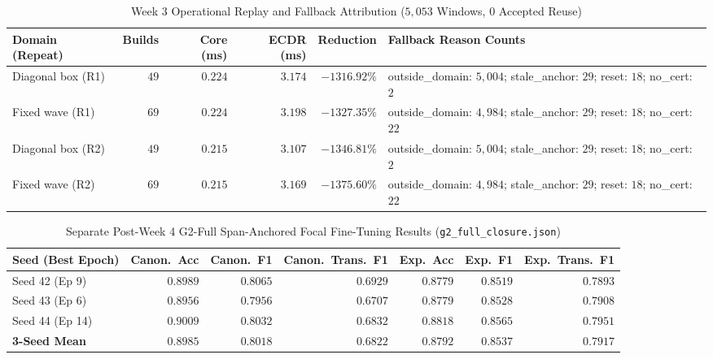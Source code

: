 \documentclass[11pt,oneside,a4paper]{report}
\newcommand{\code}[1]{{\small\upshape\ttfamily #1}}
\theoremstyle{remark}
\begin{document}
\begin{table}[htbp]
\centering\small
\caption{Week 3 Operational Replay and Fallback Attribution ($5,053$ Windows, $0$ Accepted Reuse)}
\label{tab:app_w3_replay}
\begin{tabularx}{\textwidth}{@{}lrrrrY@{}}
\toprule
\textbf{Domain (Repeat)} & \textbf{Builds} & \textbf{Core (ms)} & \textbf{ECDR (ms)} & \textbf{Reduction} & \textbf{Fallback Reason Counts} \\
\midrule
Diagonal box (R1) & $49$ & $0.224$ & $3.174$ & $-1316.92\%$ & \code{outside\_domain}: $5,004$; \code{stale\_anchor}: $29$; \code{reset}: $18$; \code{no\_cert}: $2$ \\
Fixed wave (R1) & $69$ & $0.224$ & $3.198$ & $-1327.35\%$ & \code{outside\_domain}: $4,984$; \code{stale\_anchor}: $29$; \code{reset}: $18$; \code{no\_cert}: $22$ \\
Diagonal box (R2) & $49$ & $0.215$ & $3.107$ & $-1346.81\%$ & \code{outside\_domain}: $5,004$; \code{stale\_anchor}: $29$; \code{reset}: $18$; \code{no\_cert}: $2$ \\
Fixed wave (R2) & $69$ & $0.215$ & $3.169$ & $-1375.60\%$ & \code{outside\_domain}: $4,984$; \code{stale\_anchor}: $29$; \code{reset}: $18$; \code{no\_cert}: $22$ \\
\bottomrule
\end{tabularx}
\end{table}

\begin{table}[htbp]
\centering\small\setlength{\tabcolsep}{4pt}
\caption{Separate Post-Week 4 \code{G2-Full} Span-Anchored Focal Fine-Tuning Results (\nolinkurl{g2_full_closure.json})}
\label{tab:app_g2}
\begin{tabularx}{\textwidth}{@{}Yrrrrrr@{}}
\toprule
\textbf{Seed (Best Epoch)} & \textbf{Canon.\ Acc} & \textbf{Canon.\ F1} & \textbf{Canon.\ Trans.\ F1} & \textbf{Exp.\ Acc} & \textbf{Exp.\ F1} & \textbf{Exp.\ Trans.\ F1} \\
\midrule
Seed 42 (Ep 9) & $0.8989$ & $0.8065$ & $0.6929$ & $0.8779$ & $0.8519$ & $0.7893$ \\
Seed 43 (Ep 6) & $0.8956$ & $0.7956$ & $0.6707$ & $0.8779$ & $0.8528$ & $0.7908$ \\
Seed 44 (Ep 14) & $0.9009$ & $0.8032$ & $0.6832$ & $0.8818$ & $0.8565$ & $0.7951$ \\
\midrule
\textbf{3-Seed Mean} & $\mathbf{0.8985}$ & $\mathbf{0.8018}$ & $\mathbf{0.6822}$ & $\mathbf{0.8792}$ & $\mathbf{0.8537}$ & $\mathbf{0.7917}$ \\
\bottomrule
\end{tabularx}
\end{table}
\end{document}
